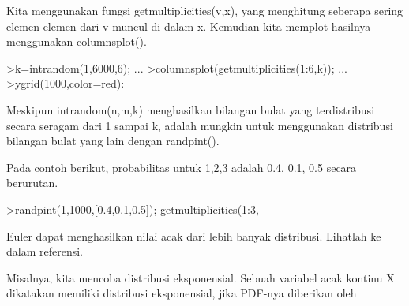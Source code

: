 \documentclass[a4paper,10pt]{article}
\begin{document}
\begin{eulernotebook}
\begin{eulercomment}
\begin{eulercomment}
\begin{eulercomment}
\begin{eulercomment}
\begin{eulercomment}
\begin{eulercomment}
\begin{eulercomment}
\begin{eulercomment}
\begin{eulercomment}
\begin{eulercomment}
\begin{eulercomment}
\begin{eulercomment}
\begin{eulercomment}
\begin{eulercomment}
\begin{eulercomment}
\begin{eulercomment}
\begin{eulercomment}
\begin{eulercomment}
\begin{eulercomment}
Kita menggunakan fungsi getmultiplicities(v,x), yang menghitung
seberapa sering elemen-elemen dari v muncul di dalam x. Kemudian kita
memplot hasilnya menggunakan columnsplot().
\end{eulercomment}
\begin{eulerprompt}
>k=intrandom(1,6000,6);  ...
>columnsplot(getmultiplicities(1:6,k));  ...
>ygrid(1000,color=red):
\end{eulerprompt}
\begin{eulercomment}
Meskipun intrandom(n,m,k) menghasilkan bilangan bulat yang
terdistribusi secara seragam dari 1 sampai k, adalah mungkin untuk
menggunakan distribusi bilangan bulat yang lain dengan randpint().

Pada contoh berikut, probabilitas untuk 1,2,3 adalah 0.4, 0.1, 0.5
secara berurutan.
\end{eulercomment}
\begin{eulerprompt}
>randpint(1,1000,[0.4,0.1,0.5]); getmultiplicities(1:3,%
\end{eulerprompt}
\begin{euleroutput}
  [391,  105,  504]
\end{euleroutput}
\begin{eulercomment}
Euler dapat menghasilkan nilai acak dari lebih banyak distribusi.
Lihatlah ke dalam referensi.

Misalnya, kita mencoba distribusi eksponensial. Sebuah variabel acak
kontinu X dikatakan memiliki distribusi eksponensial, jika PDF-nya
diberikan oleh


\end{eulercomment}
\end{eulercomment}
\end{eulercomment}
\end{eulercomment}
\end{eulercomment}
\end{eulercomment}
\end{eulercomment}
\end{eulercomment}
\end{eulercomment}
\end{eulercomment}
\end{eulercomment}
\end{eulercomment}
\end{eulercomment}
\end{eulercomment}
\end{eulercomment}
\end{eulercomment}
\end{eulercomment}
\end{eulercomment}
\end{eulercomment}
\end{eulernotebook}
\end{document}
